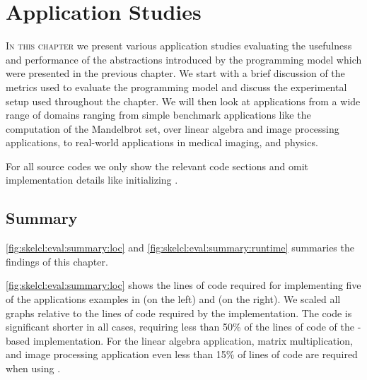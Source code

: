 \chapter{Application Studies}
\label{chapter:skelcl-evaluation}
%
%

\lettrine[lines=3, loversize=0.1]{I}{n this chapter} we present various application studies evaluating the usefulness and performance of the abstractions introduced by the \SkelCL programming model which were presented in the previous chapter.
We start with a brief discussion of the metrics used to evaluate the \SkelCL programming model and discuss the experimental setup used throughout the chapter.
We will then look at applications from a wide range of domains ranging from simple benchmark applications like the computation of the Mandelbrot set, over linear algebra and image processing applications, to real-world applications in medical imaging, and physics.

For all source codes we only show the relevant code sections and omit implementation details like initializing \SkelCL. %















% 

\section{Summary}

\autoref{fig:skelcl:eval:summary:loc} and \autoref{fig:skelcl:eval:summary:runtime} summaries the findings of this chapter.

\autoref{fig:skelcl:eval:summary:loc} shows the lines of code required for implementing five of the applications examples in \OpenCL (on the left) and \SkelCL (on the right).
We scaled all graphs relative to the lines of code required by the \OpenCL implementation.
The \SkelCL code is significant shorter in all cases, requiring less than 50\% of the lines of code of the \OpenCL-based implementation.
For the linear algebra application, matrix multiplication, and image processing application even less than 15\% of lines of code are required when using \SkelCL.

